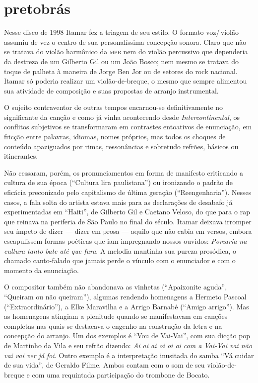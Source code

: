 \section{pretobrás}

Nesse disco de 1998 Itamar fez a triagem de seu estilo. O formato
voz/\,violão assumiu de vez o centro de sua personalíssima concepção
sonora. Claro que não se tratava do violão harmônico da \textsc{mpb} nem do
violão percussivo que dependeria da destreza de um Gilberto Gil ou um
João Bosco; nem mesmo se tratava do toque de palheta à maneira de Jorge
Ben Jor ou de setores do rock nacional. Itamar só poderia realizar um
violão-de-breque, o mesmo que sempre alimentou sua atividade de
composição e suas propostas de arranjo instrumental.

O sujeito contraventor de outras tempos encarnou-se definitivamente no
significante da canção e como já vinha acontecendo desde
\textit{Intercontinental}, os conflitos subjetivos se transformaram em contrastes
entoativos de enunciação, em fricção entre palavras, idiomas, nomes
próprios, mas todos os choques de conteúdo apaziguados por rimas,
ressonâncias e sobretudo refrões, básicos ou itinerantes.

Não cessaram, porém, os pronunciamentos em forma de manifesto criticando a cultura de sua época (``Cultura lira paulistana'') ou ironizando o
padrão de eficácia preconizado pelo capitalismo de última geração
(``Reengenharia''). Nesses casos, a fala solta do artista estava mais para
as declarações de desabafo já experimentadas em ``Haiti'', de Gilberto Gil e
Caetano Veloso, do que para o rap que reinava na periferia de São Paulo
no final do século. Itamar deixava irromper seu ímpeto de dizer ---
dizer em prosa --- aquilo que não cabia em versos, embora escapulissem
formas poéticas que iam impregnando nossos ouvidos: \textit{Porcaria na
cultura tanto bate até que fura}. A melodia mantinha sua pureza
prosódica, o chamado canto-falado que jamais perde o vínculo com o
enunciador e com o momento da enunciação.

O compositor também não abandonava as vinhetas (``Apaixonite aguda'',
``Queiram ou não queiram''), algumas rendendo homenagens a Hermeto Pascoal
(``Extraordinário''), a Elke Maravilha e a Arrigo Barnabé (``Amigo arrigo'').
Mas as homenagens atingiam a plenitude quando se manifestavam em canções
completas nas quais se destacava o engenho na construção da letra e na
concepção do arranjo. Um dos exemplos é ``Vou de Vai-Vai'', com sua dicção
pop de Martinho da Vila e seu refrão dizendo: \textit{Ai ai ai oi oi oi com a
Vai-Vai vai não vai vai ver já foi}. Outro exemplo é a interpretação
inusitada do samba ``Vá cuidar de sua vida'', de Geraldo Filme. Ambos contam
com o som de seu violão-de-breque e com uma requintada participação do
trombone de Bocato.

